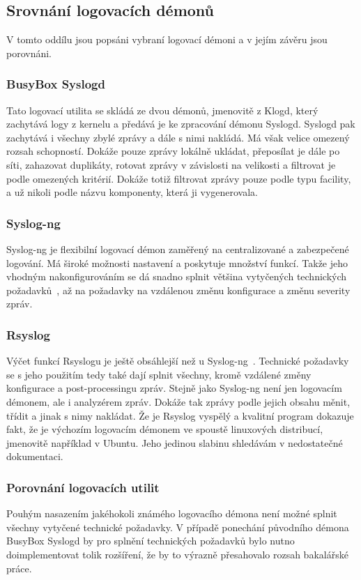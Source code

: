 \documentclass[thesis=B,czech]{FITthesis}[2012/06/26]
\begin{document}
\subsection{Srovnání logovacích démonů}
V tomto oddílu jsou popsáni vybraní logovací démoni a v jejím závěru jsou porovnáni.
\subsubsection{BusyBox Syslogd}
Tato logovací utilita se skládá ze dvou démonů, jmenovitě z Klogd, který zachytává logy z kernelu a předává je ke zpracování démonu Syslogd. Syslogd pak zachytává i všechny zbylé zprávy a dále s nimi nakládá. Má však velice omezený rozsah schopností. Dokáže pouze zprávy lokálně ukládat, přeposílat je dále po síti, zahazovat duplikáty, rotovat zprávy v závislosti na velikosti a filtrovat je podle omezených kritérií. Dokáže totiž filtrovat zprávy pouze podle typu facility, a už nikoli podle názvu komponenty, která ji vygenerovala.

\subsubsection{Syslog-ng}
Syslog-ng je flexibilní logovací démon zaměřený na centralizované a zabezpečené logování. Má široké možnosti nastavení a poskytuje množství funkcí. Takže jeho vhodným nakonfigurováním se dá snadno splnit většina vytyčených technických požadavků~\cite{syslogNg}, až na požadavky na vzdálenou změnu konfigurace a změnu severity zpráv.

\subsubsection{Rsyslog}
Výčet funkcí Rsyslogu je ještě obsáhlejší než u Syslog-ng~\cite{Rsyslog-features}. Technické požadavky se s jeho použitím tedy také dají splnit všechny, kromě vzdálené změny konfigurace a post-processingu zpráv. Stejně jako Syslog-ng není jen logovacím démonem, ale i analyzérem zpráv. Dokáže tak zprávy podle jejich obsahu měnit, třídit a jinak s nimy nakládat.
Že je Rsyslog vyspělý a kvalitní program dokazuje fakt, že je výchozím logovacím démonem ve spoustě linuxových distribucí, jmenovitě například v Ubuntu.
Jeho jedinou slabinu shledávám v nedostatečné dokumentaci.

\subsubsection{Porovnání logovacích utilit}
Pouhým nasazením jakéhokoli známého logovacího démona není možné splnit všechny vytyčené technické požadavky. V případě ponechání původního démona BusyBox Syslogd by pro splnění technických požadavků bylo nutno doimplementovat tolik rozšíření, že by to výrazně přesahovalo rozsah bakalářské práce.
\end{document}
